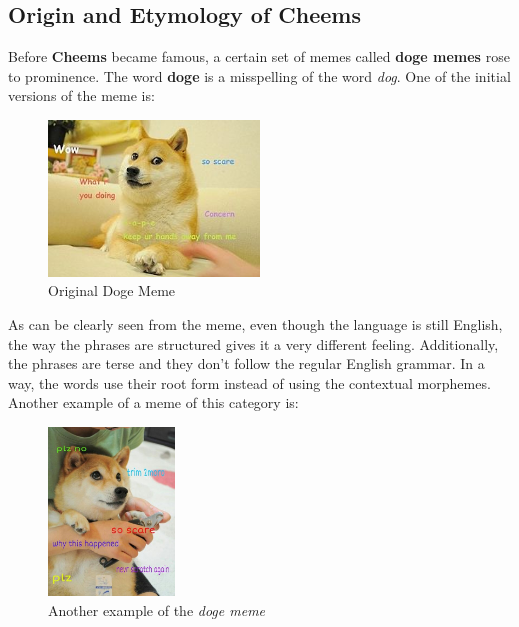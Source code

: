 \documentclass{article}
\begin{document}
\subsection{Origin and Etymology of Cheems}
Before \textbf{Cheems} became famous, a certain set of memes called \textbf{doge memes} rose to prominence. The word \textbf{doge} is a misspelling of the word \textit{dog}. One of the initial versions of the meme is:
\begin{figure}[H]
    \centering
    \includegraphics[width=0.5\textwidth]{figures/original_doge_meme.jpg}
    \caption{Original Doge Meme}
\end{figure}

As can be clearly seen from the meme, even though the language is still English, the way the phrases are structured gives it a very different feeling. Additionally, the phrases are terse and they don't follow the regular English grammar. In a way, the words use their root form instead of using the contextual morphemes. Another example of a meme of this category is:
\begin{figure}[H]
    \centering
    \includegraphics[width=0.3\textwidth]{figures/doge_2.jpg}
    \caption{Another example of the \textit{doge meme}}
\end{figure}
\end{document}
